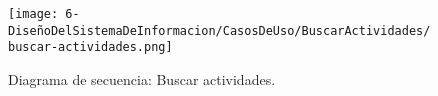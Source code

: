 \begin{figure}[H]
	\centering
	\texttt{[image: 6-DiseñoDelSistemaDeInformacion/CasosDeUso/BuscarActividades/buscar-actividades.png]}
	\caption{Diagrama de secuencia: Buscar actividades.}
\end{figure}